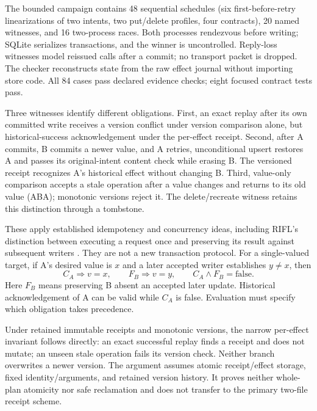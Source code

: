 \documentclass[10pt,letterpaper]{article}
\begin{document}
The bounded campaign contains 48 sequential schedules (six first-before-retry linearizations of two intents, two put/delete profiles, four contracts), 20 named witnesses, and 16 two-process races. Both processes rendezvous before writing; SQLite serializes transactions, and the winner is uncontrolled. Reply-loss witnesses model reissued calls after a commit; no transport packet is dropped. The checker reconstructs state from the raw effect journal without importing store code. All 84 cases pass declared evidence checks; eight focused contract tests pass.

Three witnesses identify different obligations. First, an exact replay after its own committed write receives a version conflict under version comparison alone, but historical-success acknowledgement under the per-effect receipt. Second, after A commits, B commits a newer value, and A retries, unconditional upsert restores A and passes its original-intent content check while erasing B. The versioned receipt recognizes A's historical effect without changing B. Third, value-only comparison accepts a stale operation after a value changes and returns to its old value (ABA); monotonic versions reject it. The delete/recreate witness retains this distinction through a tombstone.

These apply established idempotency and concurrency ideas, including RIFL's distinction between executing a request once and preserving its result against subsequent writers \cite{lee2015implementing}. They are not a new transaction protocol. For a single-valued target, if A's desired value is $x$ and a later accepted writer establishes $y\ne x$, then
\begin{equation}
C_A\Rightarrow v=x,\qquad F_B\Rightarrow v=y,\qquad C_A\land F_B=\mathrm{false}.
\end{equation}
Here $F_B$ means preserving B absent an accepted later update. Historical acknowledgement of A can be valid while $C_A$ is false. Evaluation must specify which obligation takes precedence.

Under retained immutable receipts and monotonic versions, the narrow per-effect invariant follows directly: an exact successful replay finds a receipt and does not mutate; an unseen stale operation fails its version check. Neither branch overwrites a newer version. The argument assumes atomic receipt/effect storage, fixed identity/arguments, and retained version history. It proves neither whole-plan atomicity nor safe reclamation and does not transfer to the primary two-file receipt scheme.
\end{document}
